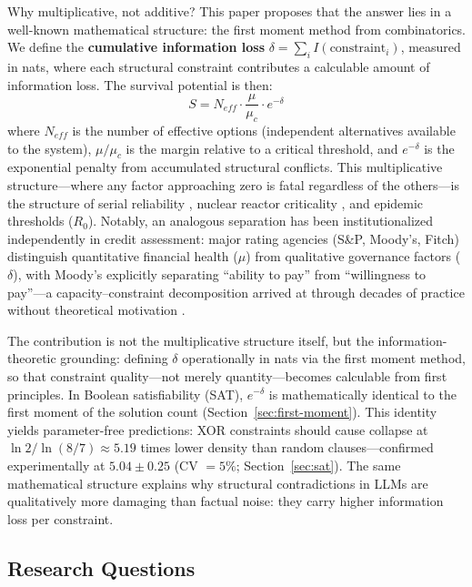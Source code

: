 \documentclass[11pt,a4paper]{article}
\begin{document}
Why multiplicative, not additive? This paper proposes that the answer lies in a well-known mathematical structure: the first moment method from combinatorics. We define the \textbf{cumulative information loss} $\delta = \sum_i I(\text{constraint}_i)$, measured in nats, where each structural constraint contributes a calculable amount of information loss. The survival potential is then:
\begin{equation}
S = N_{eff} \cdot \frac{\mu}{\mu_c} \cdot e^{-\delta}
\label{eq:survival}
\end{equation}
where $N_{eff}$ is the number of effective options (independent alternatives available to the system), $\mu/\mu_c$ is the margin relative to a critical threshold, and $e^{-\delta}$ is the exponential penalty from accumulated structural conflicts. This multiplicative structure---where any factor approaching zero is fatal regardless of the others---is the structure of serial reliability \citep{barlow1975}, nuclear reactor criticality \citep{duderstadt1976}, and epidemic thresholds ($R_0$). Notably, an analogous separation has been institutionalized independently in credit assessment: major rating agencies (S\&P, Moody's, Fitch) distinguish quantitative financial health ($\mu$) from qualitative governance factors ($\delta$), with Moody's explicitly separating ``ability to pay'' from ``willingness to pay''---a capacity--constraint decomposition arrived at through decades of practice without theoretical motivation \citep{cantor1996}.

The contribution is not the multiplicative structure itself, but the information-theoretic grounding: defining $\delta$ operationally in nats via the first moment method, so that constraint quality---not merely quantity---becomes calculable from first principles. In Boolean satisfiability (SAT), $e^{-\delta}$ is mathematically identical to the first moment of the solution count (Section~\ref{sec:first-moment}). This identity yields parameter-free predictions: XOR constraints should cause collapse at $\ln 2 / \ln(8/7) \approx 5.19$ times lower density than random clauses---confirmed experimentally at $5.04 \pm 0.25$ (CV $= 5\%$; Section~\ref{sec:sat}). The same mathematical structure explains why structural contradictions in LLMs are qualitatively more damaging than factual noise: they carry higher information loss per constraint.

\subsection{Research Questions}
\end{document}
